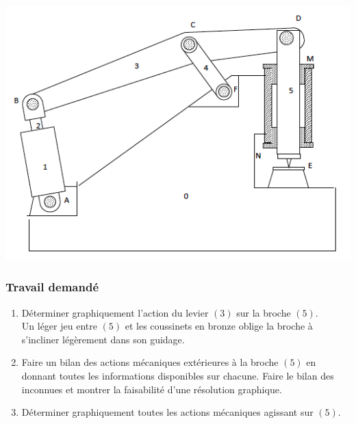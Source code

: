\begin{center}
\includegraphics[scale=0.8]{png/poiconneuse.png}
\end{center}

\subsubsection{Travail demandé}
\begin{enumerate}
\item Déterminer graphiquement l’action du levier $(3)$ sur la broche $(5)$.\\
Un léger jeu entre $(5)$ et les coussinets en bronze oblige la broche à s’incliner légèrement dans son guidage.
\item Faire un bilan des actions mécaniques extérieures à la broche $(5)$ en donnant toutes les informations disponibles sur chacune. Faire le bilan des inconnues et montrer la faisabilité d’une résolution graphique.
\item Déterminer graphiquement toutes les actions mécaniques agissant sur $(5)$.
\end{enumerate}


\newpage



